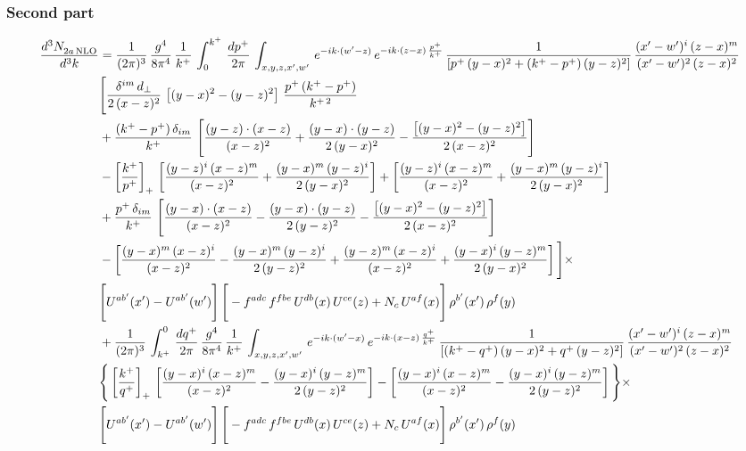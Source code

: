 \documentclass[9pt]{article}
\numberwithin{equation}{section}
\begin{document}
\subsubsection*{Second part}
\begin{align}
    \frac{d^{3}N_{2a\,\rm NLO}^{\rm}}{d^{3}k}  & =   \frac{1}{(2\pi)^{3}}\, \frac{g^{4}}{8\pi^{4}}\,\frac{1}{k^{+}}\,\int_{0}^{k^{+}}\, \frac{dp^{+}}{2\pi}\,\int_{x,y,z,x',w'}\,e^{-ik\cdot(w'-z)}\,e^{-ik\cdot (z-x)\,\frac{p^{+}}{k^{+}}}\,\frac{1}{\left[p^{+}\,(y-x)^{2}+(k^{+}-p^{+})\,(y-z)^{2}\right]}\, \frac{(x'-w')^{i}\,(z-x)^{m}}{(x'-w')^{2}\,(z-x)^{2}} \notag \\ & \Bigg[\frac{\delta^{im}\,d_{\perp}}{2\,(x-z)^{2}}\,\left[(y-x)^{2}-(y-z)^{2}\right]\,\frac{p^{+}\,(k^{+}-p^{+})}{k^{+\,2}}\notag \\ & +\frac{(k^{+}-p^{+})\,\delta_{im}}{k^{+}}\,\left[\frac{(y-z)\cdot (x-z)}{(x-z)^{2}}+\frac{(y-x)\cdot (y-z)}{2\,(y-x)^{2}}-\frac{\left[(y-x)^{2}-(y-z)^{2}\right]}{2\,(x-z)^{2}}\right]\notag \\ & -\left[\frac{k^{+}}{p^{+}}\right]_{+}\,\left[\frac{(y-z)^{i}\,(x-z)^{m}}{(x-z)^{2}}+\frac{(y-x)^{m}\,(y-z)^{i}}{2\,(y-x)^{2}}\right]+ \left[\frac{(y-z)^{i}\,(x-z)^{m}}{(x-z)^{2}}+\frac{(y-x)^{m}\,(y-z)^{i}}{2\,(y-x)^{2}}\right]\notag \\ & +\frac{p^{+}\,\delta_{im}}{k^{+}}\,\left[\frac{(y-x)\cdot (x-z)}{(x-z)^{2}}-\frac{(y-x)\cdot (y-z)}{2\,(y-z)^{2}}-\frac{\left[(y-x)^{2}-(y-z)^{2}\right]}{2\,(x-z)^{2}}\right]\notag \\ &-\left[\frac{(y-x)^{m}\,(x-z)^{i}}{(x-z)^{2}}-\frac{(y-x)^{m}\,(y-z)^{i}}{2\,(y-z)^{2}}+\frac{(y-z)^{m}\,(x-z)^{i}}{(x-z)^{2}}+\frac{(y-x)^{i}\,(y-z)^{m}}{2\,(y-x)^{2}}\right]\Bigg]\times \notag \\ & \Bigg[U^{ab'}(x')-U^{ab'}(w')\Bigg]\,\Bigg[-f^{adc}\,f^{fbe}\,U^{db}(x)\,U^{ce}(z)+N_{c}\,U^{af}(x)\Bigg]\,\rho^{b'}(x')\,\rho^{f}(y) \notag \\
& + \frac{1}{(2\pi)^{3}}\,\int^{0}_{k^{+}}\, \frac{dq^{+}}{2\pi} \,\frac{g^{4}}{8\pi^{4}}\,\frac{1}{k^{+}}\, \int_{x,y,z,x',w'}\,e^{-ik\cdot(w'-x)}\,e^{-ik\cdot (x-z)\,\frac{q^{+}}{k^{+}}}\, \frac{1}{\left[(k^{+}-q^{+})\,(y-x)^{2}+q^{+}\,(y-z)^{2}\right]}\, \frac{(x'-w')^{i}\,(z-x)^{m}}{(x'-w')^{2}\,(z-x)^{2}} \notag \\ &\Bigg\{\left[\frac{k^{+}}{q^{+}}\right]_{+}\,\left[\frac{(y-x)^{i}\,(x-z)^{m}}{(x-z)^{2}}-\frac{(y-x)^{i}\,(y-z)^{m}}{2\,(y-z)^{2}}\right] -\left[\frac{(y-x)^{i}\,(x-z)^{m}}{(x-z)^{2}}-\frac{(y-x)^{i}\,(y-z)^{m}}{2\,(y-z)^{2}}\right]\Bigg\}\times\,\notag \\ & \Bigg[U^{ab'}(x')-U^{ab'}(w')\Bigg]\,\Bigg[-f^{adc}\,f^{fbe}\,U^{db}(x)\,U^{ce}(z)+N_{c}\,U^{af}(x)\Bigg]\,\rho^{b'}(x')\,\rho^{f}(y)
\end{align}
\end{document}
